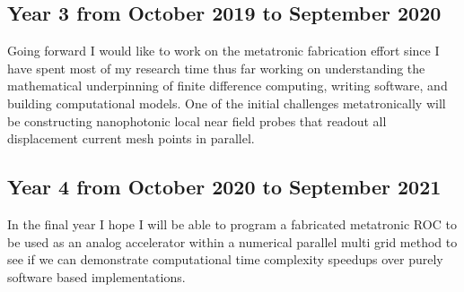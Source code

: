 \subsection{Year 3 from October 2019 to September 2020}
\par Going forward I would like to work on the metatronic fabrication effort since I have spent most of my research time thus far working on understanding the mathematical underpinning of finite difference computing, writing software, and building computational models. One of the initial challenges metatronically will be constructing nanophotonic local near field probes that readout all displacement current mesh points in parallel.

\subsection{Year 4 from October 2020 to September 2021}
\par In the final year I hope I will be able to program a fabricated metatronic ROC to be used as an analog accelerator within a numerical parallel multi grid method to see if we can demonstrate computational time complexity speedups over purely software based implementations.


